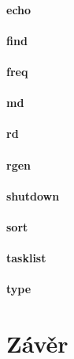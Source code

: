 \documentclass[11pt,a4paper]{scrartcl}
\begin{document}
	\paragraph{echo}
	
	\paragraph{find}
	
	\paragraph{freq}
	
	\paragraph{md}
	
	\paragraph{rd}
	
	\paragraph{rgen}
	
	\paragraph{shutdown}
	
	\paragraph{sort}
	
	\paragraph{tasklist}
	
	\paragraph{type}
	
	\section{Závěr}
	
\end{document}
